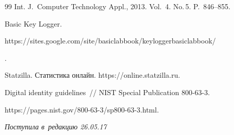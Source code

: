 {{\begin{thebibliography}{99}
{Int. J.~Computer Technology  Appl.}, 2013. Vol.~4. No.\,5. P.~846--855.







Basic Key Logger. {\sf 


https://sites.google.com/site/basiclabbook/\newline keyloggerbasiclabbook/}.







Statzilla. Статистика онлайн. {\sf https://online.statzilla.ru}.









Digital identity guidelines~/\!\!/ NIST Special Publication 800-63-3. 


{\sf https://pages.nist.gov/800-63-3/sp800-63-3.html}.


        \end{thebibliography}


} }








\vspace*{-3pt}





\hfill{\small\textit{Поступила в~редакцию 26.05.17}}





























\newpage





